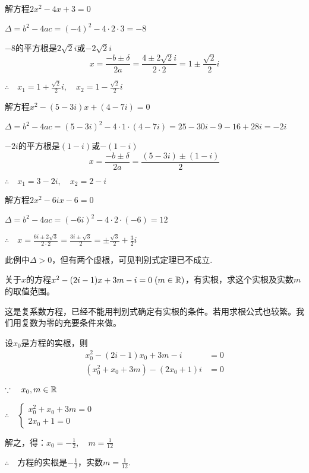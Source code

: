 \begin{example}
解方程$2x^2-4x+3=0$
\end{example}

\begin{solution}
$\Delta=b^2-4ac=(-4)^2-4\cdot 2\cdot 3=-8$

$-8$的平方根是$2\sqrt{2}i$或$-2\sqrt{2}i$
\[x=\frac{-b\pm\delta }{2a}=\frac{4\pm2\sqrt{2}i}{2\cdot 2}=1\pm\frac{\sqrt{2}}{2}i\]

$\therefore\quad x_1=1+\frac{\sqrt{2}}{2}i,\quad x_2=1-\frac{\sqrt{2}}{2}i$
\end{solution}

\begin{example}
    解方程$x^2-(5-3i)x+(4-7i)=0$
\end{example}

\begin{solution}
$\Delta =b^2-4ac=(5-3i)^2-4\cdot 1\cdot (4-7i)=25-30i-9-16+28i=-2i$

$-2i$的平方根是$(1-i)$或$-(1-i)$
\[x=\frac{-b\pm\delta }{2a}=\frac{(5-3i)\pm(1-i)}{2}\]

$\therefore\quad x_1=3-2i,\quad x_2=2-i$
\end{solution}

\begin{example}
解方程$2x^2-6ix-6=0$
\end{example}

\begin{solution}
$\Delta =b^2-4ac=(-6i)^2-4\cdot 2\cdot (-6)=12$

$\therefore\quad x=\frac{6i\pm2\sqrt{3}}{2\cdot 2}=\frac{3i\pm\sqrt{3}}{2}=\pm\frac{\sqrt{3}}{2}+\frac{3}{2}i$
\end{solution}

\begin{rmk}
    此例中$\Delta >0$，但有两个虚根，可见判别式定理已不成立.
\end{rmk}


\begin{example}
    关于$x$的方程$x^2-(2i-1)x+3m-i=0\; (m\in\mathbb{R})$，有实根，求这个实根及实数$m$的取值范围。
\end{example}

\begin{analyze}
这是复系数方程，已经不能用判别式确定有实根的条件。若用求根公式也较繁。我们用复数为零的充要条件来做。
\end{analyze}

\begin{solution}
    设$x_0$是方程的实根，则
\[\begin{split}
    x^2_0-(2i-1)x_0+3m-i&=0\\
(x^2_0+x_0+3m)-(2x_0+1)i&=0
\end{split}\]

$\because\quad x_0,m\in\mathbb{R}$

$\therefore\quad \begin{cases}
    x^2_0+x_0+3m=0\\2x_0+1=0
\end{cases}$

解之，得：$x_0=-\frac{1}{2},\quad m=\frac{1}{12}$

$\therefore\quad $方程的实根是$-\frac{1}{2}$，实数$m=\frac{1}{12}$.
\end{solution}

